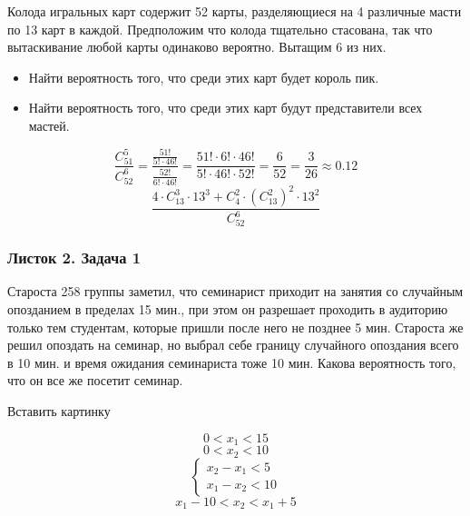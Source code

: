 \begin{exercise}
    Колода игральных карт содержит 52 карты, разделяющиеся на 4 различные масти по 13 карт в каждой. Предположим что колода тщательно стасована, так что вытаскивание любой карты одинаково вероятно. Вытащим 6 из них. 

\begin{itemize}
    \item[(a)] Найти вероятность того, что среди этих карт будет король пик. 
    \item[(b)] Найти вероятность того, что среди этих карт будут представители всех мастей.
\end{itemize}
\end{exercise}

\begin{solution}
    \[
        \frac{C^5_{51}}{C^{6}_{52}} = \frac{\frac{51!}{5! \cdot 46!}}{\frac{52!}{6! \cdot 46!}} = \frac{51! \cdot 6! \cdot 46!}{5! \cdot 46! \cdot 52!} = \frac{6}{52} = \frac{3}{26} \approx 0.12
    \]
    \[
        \frac{4 \cdot C^3_{13} \cdot 13^3 + C^2_4 \cdot (C^2_{13})^2 \cdot 13^2}{C^6_{52}}
    \]
\end{solution}

\subsubsection{Листок 2. Задача 1}

\begin{exercise}
    Староста 258 группы заметил, что семинарист приходит на занятия со случайным опозданием в пределах 15 мин., при этом он разрешает проходить в аудиторию только тем студентам, которые пришли после него не позднее 5 мин. Староста же решил опоздать на семинар, но выбрал себе границу случайного опоздания всего в 10 мин. и время ожидания семинариста тоже 10 мин. Какова вероятность того, что он все же посетит семинар.
\end{exercise}

\begin{solution}
    Вставить картинку

    \[
        0 < x_1 < 15
    \]
    \[
        0 < x_2 < 10
    \]
    \[
        \begin{cases}
            x_2 - x_1 < 5\\
            x_1 - x_2 < 10
        \end{cases}
    \]
    \[
        x_1 - 10 < x_2 < x_1 + 5
    \]
\end{solution}
